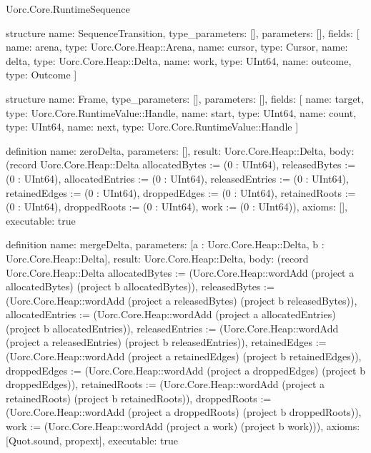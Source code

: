\begin{lexlean}{Uorc.Core.RuntimeSequence}
\begin{semanticmodule}
structure{
  name: SequenceTransition,
  type_parameters: [],
  parameters: [],
  fields: [
    {name: arena, type: Uorc.Core.Heap::Arena},
    {name: cursor, type: Cursor},
    {name: delta, type: Uorc.Core.Heap::Delta},
    {name: work, type: UInt64},
    {name: outcome, type: Outcome}
  ]
}

structure{
  name: Frame,
  type_parameters: [],
  parameters: [],
  fields: [
    {name: target, type: Uorc.Core.RuntimeValue::Handle},
    {name: start, type: UInt64},
    {name: count, type: UInt64},
    {name: next, type: Uorc.Core.RuntimeValue::Handle}
  ]
}

definition{
  name: zeroDelta,
  parameters: [],
  result: Uorc.Core.Heap::Delta,
  body: (record Uorc.Core.Heap::Delta {allocatedBytes := (0 : UInt64), releasedBytes := (0 : UInt64), allocatedEntries := (0 : UInt64), releasedEntries := (0 : UInt64), retainedEdges := (0 : UInt64), droppedEdges := (0 : UInt64), retainedRoots := (0 : UInt64), droppedRoots := (0 : UInt64), work := (0 : UInt64)}),
  axioms: [],
  executable: true
}

definition{
  name: mergeDelta,
  parameters: [a : Uorc.Core.Heap::Delta, b : Uorc.Core.Heap::Delta],
  result: Uorc.Core.Heap::Delta,
  body: (record Uorc.Core.Heap::Delta {allocatedBytes := (Uorc.Core.Heap::wordAdd (project a allocatedBytes) (project b allocatedBytes)), releasedBytes := (Uorc.Core.Heap::wordAdd (project a releasedBytes) (project b releasedBytes)), allocatedEntries := (Uorc.Core.Heap::wordAdd (project a allocatedEntries) (project b allocatedEntries)), releasedEntries := (Uorc.Core.Heap::wordAdd (project a releasedEntries) (project b releasedEntries)), retainedEdges := (Uorc.Core.Heap::wordAdd (project a retainedEdges) (project b retainedEdges)), droppedEdges := (Uorc.Core.Heap::wordAdd (project a droppedEdges) (project b droppedEdges)), retainedRoots := (Uorc.Core.Heap::wordAdd (project a retainedRoots) (project b retainedRoots)), droppedRoots := (Uorc.Core.Heap::wordAdd (project a droppedRoots) (project b droppedRoots)), work := (Uorc.Core.Heap::wordAdd (project a work) (project b work))}),
  axioms: [Quot.sound, propext],
  executable: true
}


\end{semanticmodule}
\end{lexlean}
